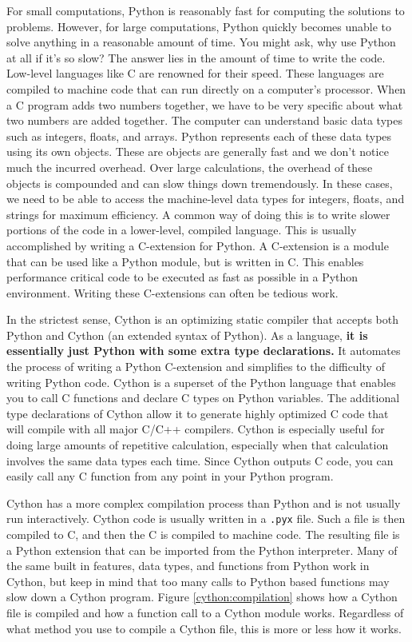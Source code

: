 \label{lab:Cython}

For small computations, Python is reasonably fast for computing the solutions to problems.
However, for large computations, Python quickly becomes unable to solve anything in a reasonable amount of time.
You might ask, why use Python at all if it's so slow?
The answer lies in the amount of time to write the code.
Low-level languages like C are renowned for their speed.  These languages are compiled to machine code that can run directly on a computer's processor.
When a C program adds two numbers together, we have to be very specific about what two numbers are added together.
The computer can understand basic data types such as integers, floats, and arrays.
Python represents each of these data types using its own objects.
These are objects are generally fast and we don't notice much the incurred overhead.
Over large calculations, the overhead of these objects is compounded and can slow things down tremendously.
In these cases, we need to be able to access the machine-level data types for integers, floats, and strings for maximum efficiency.
A common way of doing this is to write slower portions of the code in a lower-level, compiled language.
This is usually accomplished by writing a C-extension for Python.
A C-extension is a module that can be used like a Python module, but is written in C.
This enables performance critical code to be executed as fast as possible in a Python environment.
Writing these C-extensions can often be tedious work.

In the strictest sense, Cython is an optimizing static compiler that accepts both Python and Cython (an extended syntax of Python).
As a language, \textbf{it is essentially just Python with some extra type declarations.}
It automates the process of writing a Python C-extension and simplifies to the difficulty of writing Python code.
Cython is a superset of the Python language that enables you to call C functions and declare C types on Python variables.
The additional type declarations of Cython allow it to generate highly optimized C code that will compile with all major C/C++ compilers.
Cython is especially useful for doing large amounts of repetitive calculation, especially when that calculation involves the same data types each time.
Since Cython outputs C code, you can easily call any C function from any point in your Python program.

Cython has a more complex compilation process than Python and is not usually run interactively.
Cython code is usually written in a \texttt{.pyx} file.
Such a file is then compiled to C, and then the C is compiled to machine code.
The resulting file is a Python extension that can be imported from the Python interpreter.
Many of the same built in features, data types, and functions from Python work in Cython, but keep in mind that too many calls to Python based functions may slow down a Cython program.
Figure \ref{cython:compilation} shows how a Cython file is compiled and how a function call to a Cython module works.
Regardless of what method you use to compile a Cython file, this is more or less how it works.

